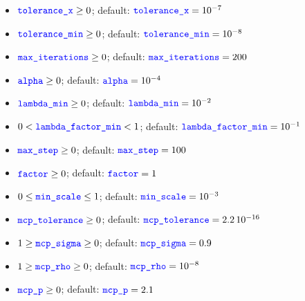 \begin{itemize}
\item $\nt{tolerance\_x} \ge 0$; default: $\nt{tolerance\_x}=10^{-7}$
\item $\nt{tolerance\_min} \ge 0$; default: $\nt{tolerance\_min} = 10^{-8}$
\item $\nt{max\_iterations} \ge 0$; default: $\nt{max\_iterations} = 200$
\item $\nt{alpha} \ge 0$; default: $\nt{alpha}=10^{-4}$
\item $\nt{lambda\_min} \ge 0$; default: $\nt{lambda\_min}=10^{-2}$
\item $0 < \nt{lambda\_factor\_min} < 1$; default: $\nt{lambda\_factor\_min}=10^{-1}$
\item $\nt{max\_step} \ge 0$; default: $\nt{max\_step} = 100$
\item $\nt{factor} \ge 0$; default: $\nt{factor} = 1$
\item $0 \le \nt{min\_scale} \le 1$; default: $\nt{min\_scale}=10^{-3}$
\item $\nt{mcp\_tolerance} \ge 0$; default: $\nt{mcp\_tolerance}=2.2\,10^{-16}$
\item $1 \ge \nt{mcp\_sigma} \ge 0$; default: $\nt{mcp\_sigma}=0.9$
\item $1 \ge \nt{mcp\_rho} \ge 0$; default: $\nt{mcp\_rho}=10^{-8}$
\item $\nt{mcp\_p} \ge 0$; default: $\nt{mcp\_p}=2.1$
\end{itemize}


